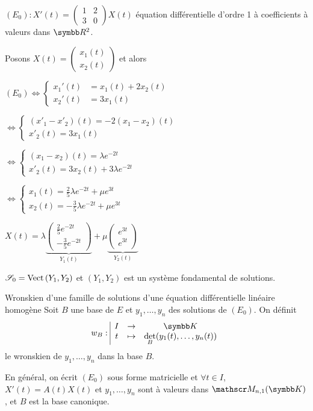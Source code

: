 \begin{exemple}
    $(E_0) : X'(t) = \begin{pmatrix}
        1 & 2 \\ 
        3 & 0
    \end{pmatrix} X(t)$ équation différentielle d'ordre 1 à coefficients à valeurs dans $\R^2$. 

    Posons $X(t) = \begin{pmatrix}
        x_1(t) \\ x_2(t)
    \end{pmatrix}$ et alors 

    $(E_0) \Leftrightarrow \begin{cases}
        x_1'(t) & = x_1(t) + 2x_2(t) \\
        x_2'(t) & = 3x_1(t)
    \end{cases}$

    $\Leftrightarrow \begin{cases}
        (x'_1 - x'_2)(t) = -2 (x_1 - x_2)(t) \\
        x'_2(t) = 3 x_1(t)
    \end{cases}$

    \svspace $\Leftrightarrow \begin{cases}
        (x_1 - x_2)(t) = \lambda e^{-2t} \\
        x'_2(t) = 3x_2(t) + 3 \lambda e^{-2t}
    \end{cases}$

    \svspace $\Leftrightarrow \begin{cases}
        x_1(t) = \frac 2 5 \lambda e^{-2t} + \mu e^{3t} \\
        x_2(t) = -\frac 3 5 \lambda e^{-2t} + \mu e^{3t}
    \end{cases}$

    \svspace $X(t) = \lambda \underbrace{\begin{pmatrix}
        \frac 2 5 e^{-2t} \\ -\frac 3 5 e^{-2t}
    \end{pmatrix}}_{Y_1(t)} + \mu \underbrace{\begin{pmatrix}
        e^{3t} \\ e^{3t}
    \end{pmatrix}}_{Y_2(t)}$

    $\mathscr S_0 = \operatorname{Vect} \, (Y_1, Y_2)$ et $(Y_1, Y_2)$ est un système fondamental de solutions.
\end{exemple}

\begin{definitionnt}{Wronskien d'une famille de solutions d'une équation différentielle linéaire homogène}{}
    Soit $B$ une base de $E$ et $y_1, \dots, y_n$ des solutions de $(E_0)$. 
    On définit $$\fonction{w_B} I \K t {\det_B (y_1(t), \dots, y_n(t))}$$
    le wronskien de $y_1, \dots, y_n$ dans la base $B$.

    En général, on écrit $(E_0)$ sous forme matricielle et $\forall t \in I$, 
    $X'(t) = A(t) X(t)$ et 
    $y_1, \dots, y_n$ sont à valeurs dans $\mathscr M_{n, 1}(\K)$, et $B$ est la base canonique. 
\end{definitionnt}

